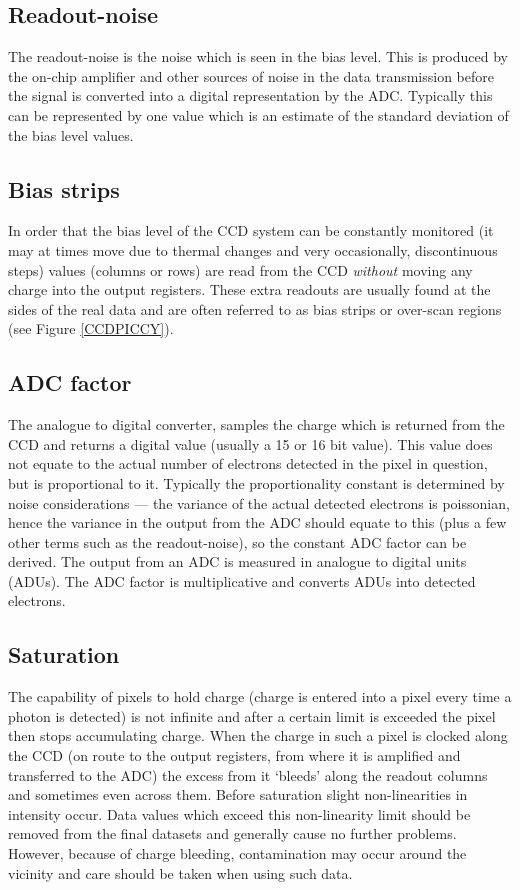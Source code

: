 \subsection{Readout-noise}

The readout-noise is the noise which is seen in the bias level. This is produced
by the on-chip amplifier and other sources of noise in the data transmission
before the signal is converted into a digital representation by the ADC.
Typically this can be represented by one value which is an estimate of the
standard deviation of the bias level values.

\subsection{Bias strips}

In order that the bias level of the CCD system can be constantly monitored (it
may at times move due to thermal changes and very occasionally, discontinuous
steps) values (columns or rows) are read from the CCD {\em without} moving any
charge into the output registers. These extra readouts are usually found at the
sides of the real data and are often referred to as bias strips or over-scan
regions (see Figure \ref{CCDPICCY}).

\subsection{ADC factor}

The analogue to digital converter, samples the charge which is returned from
the CCD and returns a digital value (usually a 15 or 16 bit value). This value
does not equate to the actual number of electrons detected in the pixel in
question, but is proportional to it. Typically the proportionality constant is
determined by noise considerations --- the variance of the actual detected
electrons is poissonian, hence the variance in the output from the ADC should
equate to this (plus a few other terms such as the readout-noise), so the
constant ADC factor can be derived. The output from an ADC is measured in
analogue to digital units (ADUs). The ADC factor is multiplicative and converts
ADUs into detected electrons.

\subsection{Saturation}

The capability of pixels to hold charge (charge is entered into a pixel
every time a photon is detected) is not infinite and after a certain
limit is exceeded the pixel then stops accumulating charge. When the
charge in such a pixel is clocked along the CCD (on route to the output
registers, from where it is amplified and transferred to the ADC) the
excess from it `bleeds' along the readout columns and sometimes even
across them. Before saturation slight non-linearities in
intensity occur. Data values which exceed this non-linearity limit
should be removed from the final datasets and generally cause no further
problems. However, because of charge bleeding, contamination may occur
around the vicinity and care should be taken when using such data.

